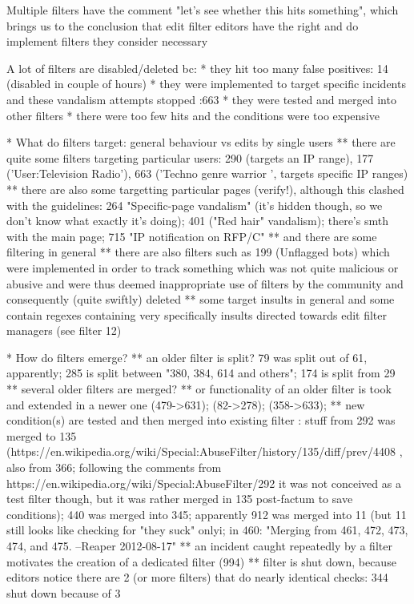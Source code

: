 Multiple filters have the comment "let's see whether this hits something", which brings us to the conclusion that edit filter editors have the right and do implement filters they consider necessary

A lot of filters are disabled/deleted bc:
* they hit too many false positives: 14 (disabled in couple of hours)
* they were implemented to target specific incidents and these vandalism attempts stopped :663
* they were tested and merged into other filters
* there were too few hits and the conditions were too expensive

* What do filters target: general behaviour vs edits by single users
  ** there are quite some filters targeting particular users: 290 (targets an IP range), 177 ('User:Television Radio'), 663 ('Techno genre warrior
', targets specific IP ranges)
  ** there are also some targetting particular pages (verify!), although this clashed with the guidelines: 264 "Specific-page vandalism" (it's hidden though, so we don't know what exactly it's doing); 401 ("Red hair" vandalism); there's smth with the main page; 715 "IP notification on RFP/C"
  ** and there are some filtering in general
  ** there are also filters such as 199 (Unflagged bots) which were implemented in order to track something which was not quite malicious or abusive and were thus deemed inappropriate use of filters by the community and consequently (quite swiftly) deleted
  ** some target insults in general and some contain regexes containing very specifically insults directed towards edit filter managers (see filter 12)

* How do filters emerge?
  ** an older filter is split? 79 was split out of 61, apparently; 285 is split between "380, 384, 614 and others"; 174 is split from 29
  ** several older filters are merged?
  ** or functionality of an older filter is took and extended in a newer one (479->631); (82->278); (358->633);
  ** new condition(s) are tested and then merged into existing filter : stuff from 292 was merged to 135 (https://en.wikipedia.org/wiki/Special:AbuseFilter/history/135/diff/prev/4408 , also from 366; following the comments from https://en.wikipedia.org/wiki/Special:AbuseFilter/292 it was not conceived as a test filter though, but it was rather merged in 135 post-factum to save conditions); 440 was merged into 345; apparently 912 was merged into 11 (but 11 still looks like checking for "they suck" only^^); in 460: "Merging from 461, 472, 473, 474, and 475. --Reaper 2012-08-17"
  ** an incident caught repeatedly by a filter motivates the creation of a dedicated filter (994)
  ** filter is shut down, because editors notice there are 2 (or more filters) that do nearly identical checks: 344 shut down because of 3

